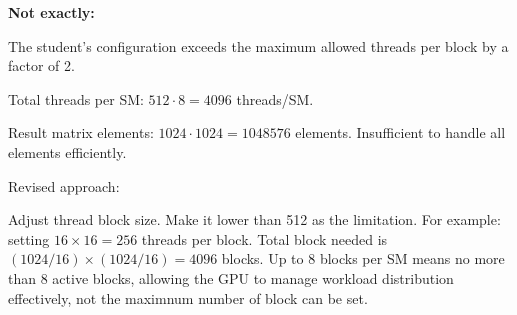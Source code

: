 \documentclass{article}
\begin{document}
\textbf{Not exactly:}

The student's configuration exceeds the maximum allowed threads per block by a factor of 2.

Total threads per SM: \(512\cdot8=4096\) threads/SM.

Result matrix elements: \(1024\cdot1024=1048576\) elements. Insufficient to handle all elements efficiently.

Revised approach:

Adjust thread block size. Make it lower than 512 as the limitation. For example: setting \(16\times16=256\) threads per block. Total block needed is \((1024/16)\times(1024/16)=4096\) blocks. Up to 8 blocks per SM means no more than 8 active blocks, allowing the GPU to manage workload distribution effectively, not the maximnum number of block can be set.
\end{document}
